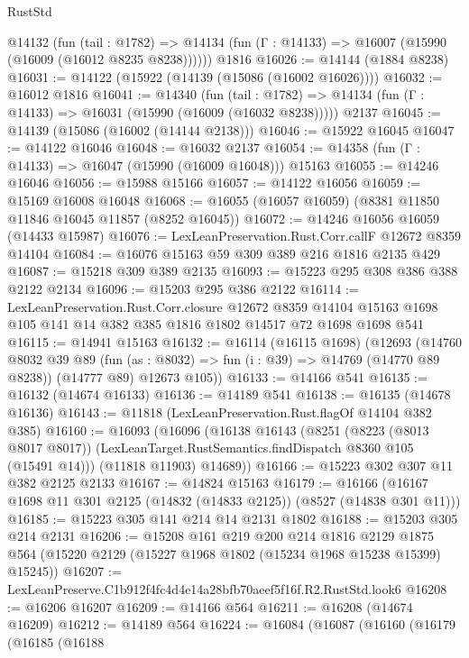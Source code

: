 \begin{lexlean}{RustStd}
\begin{coremodule}
    @14132
      (fun (tail : @1782) =>
      @14134 (fun (Γ : @14133) => @16007 (@15990 (@16009 (@16012 @8235 @8238))))))
    @1816
@16026 := @14144 (@1884 @8238)
@16031 := @14122 (@15922 (@14139 (@15086 (@16002 @16026))))
@16032 := @16012 @1816
@16041 := @14340
    (fun (tail : @1782) => @14134 (fun (Γ : @14133) => @16031 (@15990 (@16009 (@16032 @8238)))))
    @2137
@16045 := @14139 (@15086 (@16002 (@14144 @2138)))
@16046 := @15922 @16045
@16047 := @14122 @16046
@16048 := @16032 @2137
@16054 := @14358 (fun (Γ : @14133) => @16047 (@15990 (@16009 @16048))) @15163
@16055 := @14246 @16046
@16056 := @15988 @15166
@16057 := @14122 @16056
@16059 := @15169 @16008 @16048
@16068 := @16055 (@16057 @16059) (@8381 @11850 @11846 @16045 @11857 (@8252 @16045))
@16072 := @14246 @16056 @16059 (@14433 @15987)
@16076 := LexLeanPreservation.Rust.Corr.callF @12672 @8359 @14104
@16084 := @16076 @15163 @59 @309 @389 @216 @1816 @2135 @429
@16087 := @15218 @309 @389 @2135
@16093 := @15223 @295 @308 @386 @388 @2122 @2134
@16096 := @15203 @295 @386 @2122
@16114 := LexLeanPreservation.Rust.Corr.closure
    @12672
    @8359
    @14104
    @15163
    @1698
    @105
    @141
    @14
    @382
    @385
    @1816
    @1802
    @14517
    @72
    @1698
    @1698
    @541
@16115 := @14941 @15163
@16132 := @16114
    (@16115 @1698)
    (@12693
      (@14760
        @8032
        @39
        @89
        (fun (as : @8032) => fun (i : @39) => @14769 (@14770 @89 @8238))
        (@14777 @89)
        @12673
        @105))
@16133 := @14166 @541
@16135 := @16132 (@14674 @16133)
@16136 := @14189 @541
@16138 := @16135 (@14678 @16136)
@16143 := @11818 (LexLeanPreservation.Rust.flagOf @14104 @382 @385)
@16160 := @16093
    (@16096
      (@16138
        @16143
        (@8251
          (@8223 (@8013 @8017 @8017))
          (LexLeanTarget.RustSemantics.findDispatch @8360 @105 (@15491 @14)))
        (@11818 @11903)
        @14689))
@16166 := @15223 @302 @307 @11 @382 @2125 @2133
@16167 := @14824 @15163
@16179 := @16166 (@16167 @1698 @11 @301 @2125 (@14832 (@14833 @2125)) (@8527 (@14838 @301 @11)))
@16185 := @15223 @305 @141 @214 @14 @2131 @1802
@16188 := @15203 @305 @214 @2131
@16206 := @15208
    @161
    @219
    @200
    @214
    @1816
    @2129
    @1875
    @564
    (@15220 @2129 (@15227 @1968 @1802 (@15234 @1968 @15238 @15399) @15245))
@16207 := LexLeanPreserve.C1b912f4fc4d4e14a28bfb70aeef5f16f.R2.RustStd.look6
@16208 := @16206 @16207
@16209 := @14166 @564
@16211 := @16208 (@14674 @16209)
@16212 := @14189 @564
@16224 := @16084
    (@16087
      (@16160
        (@16179
          (@16185
            (@16188

\end{coremodule}
\end{lexlean}
